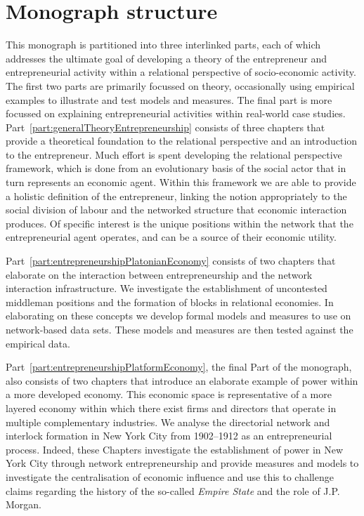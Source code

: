 \section{Monograph structure}

This monograph is partitioned into three interlinked parts, each of which addresses the ultimate goal of developing a theory of the entrepreneur and entrepreneurial activity within a relational perspective of socio-economic activity. The first two parts are primarily focussed on theory, occasionally using empirical examples to illustrate and test models and measures. The final part is more focussed on explaining entrepreneurial activities within real-world case studies. Part~\ref{part:generalTheoryEntrepreneurship} consists of three chapters that provide a theoretical foundation to the relational perspective and an introduction to the entrepreneur. Much effort is spent developing the relational perspective framework, which is done from an evolutionary basis of the social actor that in turn represents an economic agent. Within this framework we are able to provide a holistic definition of the entrepreneur, linking the notion appropriately to the social division of labour and the networked structure that economic interaction produces. Of specific interest is the unique positions within the network that the entrepreneurial agent operates, and can be a source of their economic utility.

Part~\ref{part:entrepreneurshipPlatonianEconomy} consists of two chapters that elaborate on the interaction between entrepreneurship and the network interaction infrastructure. We investigate the establishment of uncontested middleman positions and the formation of blocks in relational economies. In elaborating on these concepts we develop formal models and measures to use on network-based data sets. These models and measures are then tested against the empirical data.

Part~\ref{part:entrepreneurshipPlatformEconomy}, the final Part of the monograph, also consists of two chapters that introduce an elaborate example of power within a more developed economy. This economic space is representative of a more layered economy within which there exist firms and directors that operate in multiple complementary industries. We analyse the directorial network and interlock formation in New York City from 1902--1912 as an entrepreneurial process. Indeed, these Chapters investigate the establishment of power in New York City through network entrepreneurship and provide measures and models to investigate the centralisation of economic influence and use this to challenge claims regarding the history of the so-called \emph{Empire State} and the role of J.P. Morgan.
